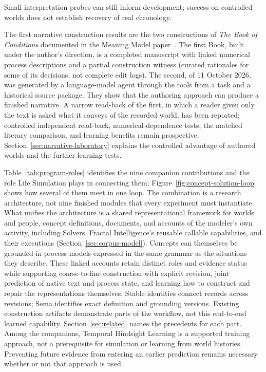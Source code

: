 \documentclass[10pt]{article}
\newcommand{\Book}{\textit{The Book of Conditions}}
\begin{document}
Small interpretation probes can still inform development; success on
controlled worlds does not establish recovery of real chronology.

The first narrative construction results are the two constructions of \Book{}
documented in the Meaning Model paper~\cite{westerbergMeaning2026}. The first Book,
built under the author's direction, is a completed manuscript with linked numerical
process descriptions and a partial construction witness (curated rationales for some of
its decisions, not complete edit logs). The second, of 11 October
2026, was generated by a language-model agent through the tools from a task and a
historical source package. They show that the authoring approach can produce a
finished narrative. A narrow read-back of the first, in which a reader
given only the text is asked what it conveys of the recorded world, has been
reported; controlled independent read-back, numerical-dependence tests, the matched literary comparison, and learning
benefits remain prospective. Section~\ref{sec:narrative-laboratory} explains the
controlled advantage of authored worlds and the further learning tests.

Table~\ref{tab:program-roles} identifies the nine companion contributions and
the role Life Simulation plays in connecting them;
Figure~\ref{fig:concept-solution-loop} shows how several of them meet in one loop. The combination is a
research architecture, not nine finished modules that every experiment must
instantiate. What unifies the architecture is a shared representational
framework for worlds and people, concept definitions, documents, and accounts
of the modeler's own activity, including Solvers, Fractal Intelligence's reusable callable
capabilities, and their executions
(Section~\ref{sec:corpus-model}). Concepts can
themselves be grounded in process models expressed in the same grammar as the
situations they describe. These linked accounts retain distinct roles and
evidence status while supporting coarse-to-fine construction with explicit
revision, joint prediction of native text and process state, and learning how
to construct and repair the representations themselves. Stable identities
connect records across revisions; Sema identifies exact definition and
grounding versions. Existing
construction artifacts demonstrate parts of the workflow, not this end-to-end
learned capability. Section~\ref{sec:related} names the precedents for each
part. Among the companions, Temporal Hindsight Learning is a supported training
approach, not
a prerequisite for simulation or learning from world histories. Preventing
future evidence from entering an earlier prediction remains necessary whether
or not that approach is used.
\end{document}
